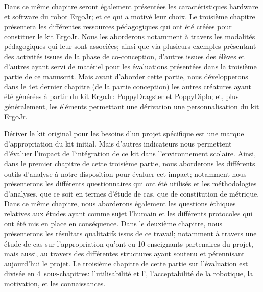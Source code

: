             Dans ce même chapitre seront également présentées les caractéristiques hardware et software du robot ErgoJr; et ce qui a motivé leur choix.
            Le troisième chapitre présentera les différentes ressources pédagogiques qui ont été créées pour constituer le kit ErgoJr. Nous les aborderons notamment à travers les modalités pédagogiques qui leur sont associées; ainsi que via
            plusieurs exemples présentant des activités issues de la phase de co-conception, d'autres issues des élèves et d'autres ayant servi de matériel pour les évaluations présentées dans la troisième partie de ce manuscrit.
            Mais avant d'aborder cette partie, nous développerons dans le 4\ieme et dernier chapitre (de la partie conception) les autres créatures ayant été générées à partir du kit ErgoJr: PoppyDragster et PoppyDiplo; et, plus généralement, les éléments permettant une dérivation \etou une personnalisation du kit ErgoJr.\par%
        Dériver le kit original pour les besoins d'un projet spécifique est une marque d'appropriation du kit initial.
        Mais d'autres indicateurs nous permettent d'évaluer l'impact de l'intégration de ce kit dans l'environnement scolaire.
            Ainsi, dans le premier chapitre de cette troisième partie, nous aborderons les différents outils d'analyse à notre disposition pour évaluer cet impact; notamment nous présenterons les différents questionnaires qui ont été utilisés et les méthodologies d'analyses, que ce soit en termes d'étude de cas, que de constitution de métrique.
            Dans ce même chapitre, nous aborderons également les questions éthiques relatives aux études ayant comme sujet l'humain et les différents protocoles qui ont été mis en place en conséquence.
            Dans le deuxième chapitre, nous présenterons les résultats qualitatifs issus de ce travail; notamment à travers une étude de cas sur l'appropriation qu'ont eu 10 enseignants partenaires du projet, mais aussi, au travers des différentes structures ayant soutenu et pérennisant aujourd'hui le projet.
            Le troisième chapitre de cette partie sur l'évaluation est divisée en 4~sous-chapitres: \Li l'utilisabilité et l', \ii l'acceptabilité de la robotique, \iii la motivation, et \iiii les connaissances.\par%
